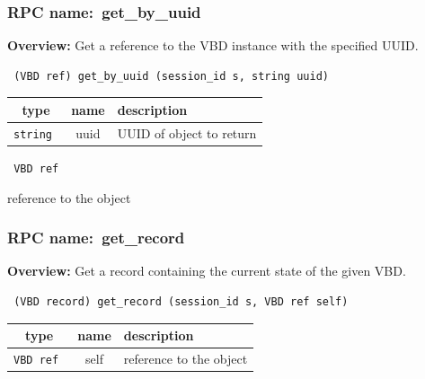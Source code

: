 \subsubsection{RPC name:~get\_by\_uuid}

{\bf Overview:} 
Get a reference to the VBD instance with the specified UUID.

\begin{verbatim} (VBD ref) get_by_uuid (session_id s, string uuid)\end{verbatim}



 
\vspace{0.3cm}
\begin{tabular}{|c|c|p{7cm}|}
 \hline
{\bf type} & {\bf name} & {\bf description} \\ \hline
{\tt string } & uuid & UUID of object to return \\ \hline 

\end{tabular}

\vspace{0.3cm}

{\tt 
VBD ref
}


reference to the object
\vspace{0.3cm}
\vspace{0.3cm}
\vspace{0.3cm}
\subsubsection{RPC name:~get\_record}

{\bf Overview:} 
Get a record containing the current state of the given VBD.

\begin{verbatim} (VBD record) get_record (session_id s, VBD ref self)\end{verbatim}



 
\vspace{0.3cm}
\begin{tabular}{|c|c|p{7cm}|}
 \hline
{\bf type} & {\bf name} & {\bf description} \\ \hline
{\tt VBD ref } & self & reference to the object \\ \hline 

\end{tabular}

